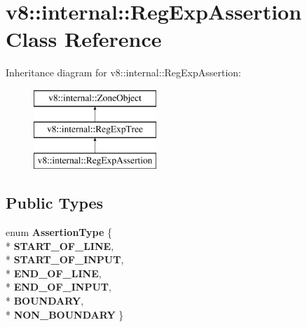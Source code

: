 \hypertarget{classv8_1_1internal_1_1_reg_exp_assertion}{}\section{v8\+:\+:internal\+:\+:Reg\+Exp\+Assertion Class Reference}
\label{classv8_1_1internal_1_1_reg_exp_assertion}
Inheritance diagram for v8\+:\+:internal\+:\+:Reg\+Exp\+Assertion\+:\begin{figure}[H]
\begin{center}
\leavevmode
\includegraphics[height=3.000000cm]{classv8_1_1internal_1_1_reg_exp_assertion}
\end{center}
\end{figure}
\subsection*{Public Types}
\begin{DoxyCompactItemize}
\item 
enum {\bfseries Assertion\+Type} \{ \\*
{\bfseries S\+T\+A\+R\+T\+\_\+\+O\+F\+\_\+\+L\+I\+NE}, 
\\*
{\bfseries S\+T\+A\+R\+T\+\_\+\+O\+F\+\_\+\+I\+N\+P\+UT}, 
\\*
{\bfseries E\+N\+D\+\_\+\+O\+F\+\_\+\+L\+I\+NE}, 
\\*
{\bfseries E\+N\+D\+\_\+\+O\+F\+\_\+\+I\+N\+P\+UT}, 
\\*
{\bfseries B\+O\+U\+N\+D\+A\+RY}, 
\\*
{\bfseries N\+O\+N\+\_\+\+B\+O\+U\+N\+D\+A\+RY}
 \}\hypertarget{classv8_1_1internal_1_1_reg_exp_assertion_a726548397a09020b1228fdfa4f410c29}{}\label{classv8_1_1internal_1_1_reg_exp_assertion_a726548397a09020b1228fdfa4f410c29}

\end{DoxyCompactItemize}
